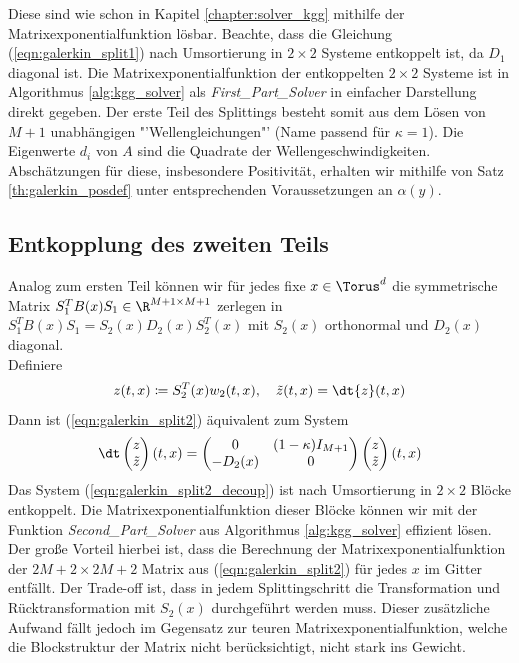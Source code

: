 Diese sind wie schon in Kapitel \ref{chapter:solver_kgg} mithilfe der Matrixexponentialfunktion lösbar. Beachte, dass die Gleichung (\ref{eqn:galerkin_split1}) nach Umsortierung in $2\times 2$ Systeme entkoppelt ist, da $D_1$ diagonal ist. Die Matrixexponentialfunktion der entkoppelten $2\times 2$ Systeme ist in Algorithmus \ref{alg:kgg_solver} als \emph{First\_Part\_Solver} in einfacher Darstellung direkt gegeben. Der erste Teil des Splittings besteht somit aus dem Lösen von $M+1$ unabhängigen "'Wellengleichungen"' (Name passend für $\kappa=1$). Die Eigenwerte $d_i$ von $A$ sind die Quadrate der Wellengeschwindigkeiten. Abschätzungen für diese, insbesondere Positivität, erhalten wir mithilfe von Satz \ref{th:galerkin_posdef} unter entsprechenden Voraussetzungen an $\alpha(y)$.

\subsection{Entkopplung des zweiten Teils}
Analog zum ersten Teil können wir für jedes fixe $x\in\Torus^d$ die symmetrische Matrix $S_1^TB(x)S_1\in\R^{M+1\times M+1}$ zerlegen in $S_1^TB(x)S_1=S_2(x)D_2(x)S_2^T(x)$ mit $S_2(x)$ orthonormal und $D_2(x)$ diagonal.\\
Definiere
\[z(t,x)\coloneqq S_2^T(x) w_2(t,x), \quad \tilde{z}(t,x)=\dt{z}(t,x)\]
Dann ist (\ref{eqn:galerkin_split2}) äquivalent zum System
\begin{equation}
\label{eqn:galerkin_split2_decoup}
\dt\begin{pmatrix}z\\ \tilde{z}\end{pmatrix}(t,x)=\begin{pmatrix}0&(1-\kappa)I_{M+1}\\-D_2(x) & 0\end{pmatrix}\begin{pmatrix}z\\\tilde{z}\end{pmatrix}(t,x)
\end{equation}
Das System (\ref{eqn:galerkin_split2_decoup}) ist nach Umsortierung in $2\times 2$ Blöcke entkoppelt. Die Matrixexponentialfunktion dieser Blöcke können wir mit der Funktion \emph{Second\_Part\_Solver} aus Algorithmus \ref{alg:kgg_solver} effizient lösen. Der große Vorteil hierbei ist, dass die Berechnung der Matrixexponentialfunktion der $2M+2\times 2M+2$ Matrix aus (\ref{eqn:galerkin_split2}) für jedes $x$ im Gitter entfällt. Der Trade-off ist, dass in jedem Splittingschritt die Transformation und Rücktransformation mit $S_2(x)$ durchgeführt werden muss. Dieser zusätzliche Aufwand fällt jedoch im Gegensatz zur teuren Matrixexponentialfunktion, welche die Blockstruktur der Matrix nicht berücksichtigt, nicht stark ins Gewicht.
